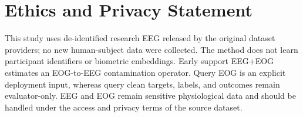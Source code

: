 \documentclass[acmsmall,screen,review]{acmart}
\begin{document}
\section*{Ethics and Privacy Statement}
This study uses de-identified research EEG released by the original dataset
providers; no new human-subject data were collected. The method does not learn
participant identifiers or biometric embeddings. Early support EEG+EOG
estimates an EOG-to-EEG contamination operator. Query EOG is an explicit
deployment input, whereas query clean targets, labels, and outcomes remain
evaluator-only. EEG and EOG remain sensitive physiological data and should be
handled under the access and privacy terms of the source dataset.





\end{document}
